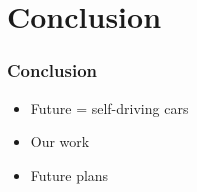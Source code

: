\documentclass{beamer}
\begin{document}
\section{Conclusion}

\begin{frame}
    \frametitle{Conclusion}
    \begin{itemize}
        \item Future = self-driving cars
        \item Our work
        \item Future plans
    \end{itemize}
\end{frame}






\end{document}
